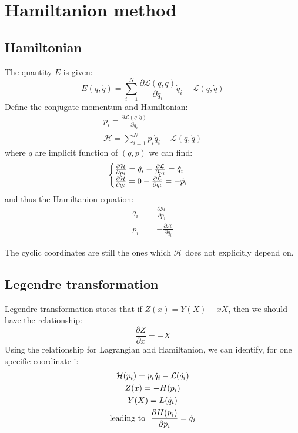 \documentclass{article}
\newcommand{\pfrac}[2]{\frac{\partial #1}{\partial #2}}
\renewcommand{\L}{\mathcal{L}}
\renewcommand{\H}{\mathcal{H}}
\newcommand{\dotq}{\dot{q}}
\newcommand{\dotp}{\dot{p}}
\begin{document}
\section{Hamiltanion method}
\subsection{Hamiltonian}
The quantity $E$ is given:
\begin{equation}
    E(q,\dotq) = \sum_{i=1}^N \pfrac{\L(q,\dotq)}{\dotq_i} \dotq_i - \L(q,\dotq) 
\end{equation}
Define the conjugate momentum and Hamiltonian:
\begin{gather}
    p_i = \pfrac{\L(q,\dotq)}{\dotq_i} \\
    \H = \sum_{i=1}^N p_i \dotq_i - \L(q,\dotq)
\end{gather}
where $\dotq$ are implicit function of $(q,p)$
we can find:
\begin{equation}
    \begin{cases}
        \pfrac{\H}{p_i} = \dotq_i - \pfrac{\L}{p_i} = \dotq_i \notag \\
        \pfrac{\H}{q_i} = 0 - \pfrac{\L}{q_i} = - \dotp_i \notag \\
    \end{cases}
\end{equation}
and thus the Hamiltanion equation:
\begin{align}
        \dotq_i &= \pfrac{\H}{p_i} \\
        \dotp_i &= - \pfrac{\H}{q_i}
\end{align}

The cyclic coordinates are still the ones which $\H$ does not explicitly depend on.

\subsection{Legendre transformation}
Legendre transformation states that if $Z(x) = Y(X) - xX$, then we should have the 
relationship:
\begin{equation}
    \pfrac{Z}{x} = -X
\end{equation}
Using the relationship for Lagrangian and Hamiltanion, we can identify, for one specific coordinate i:
\begin{gather}
    \H(p_i) = p_i \dotq_i - \L(\dotq_i) \notag \\
    Z(x) = -H(p_i) \notag \\
    Y(X) = L(\dotq_i) \notag \\
    \text{leading to}\ \ \pfrac{H(p_i)}{p_i} = \dotq_i
\end{gather}
\end{document}

